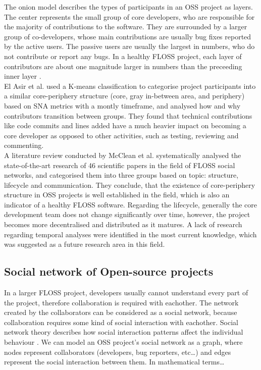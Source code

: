 The onion model describes the types of participants in an OSS project as layers. The center represents the small group of core developers, who are responsible for the majority of contributions to the software. They are surrounded by a larger group of co-developers, whose main contributions are usually bug fixes reported by the active users. The passive users are usually the largest in numbers, who do not contribute or report any bugs. In a healthy FLOSS project, each layer of contributors are about one magnitude larger in numbers than the preceeding inner layer \cite{mockusTwoCaseStudies2002}. \\

El Asir et al. \cite{elasriPeripheryCoreTemporal2017} used a K-means classification to categorise project participants into a similar core-periphery structure (core, gray in-between area, and periphery) based on SNA metrics with a montly timeframe, and analysed how and why contributors transition between groups. They found that technical contributions like code commits and lines added have a much heavier impact on becoming a core developer as opposed to other activities, such as testing, reviewing and commenting. \\

A literature review conducted by McClean et al. \cite{mccleanSocialNetworkAnalysis2021} systematically analysed the state-of-the-art research of 46 scientific papers in the field of FLOSS social networks, and categorised them into three groups based on topic: structure, lifecycle and communication. They conclude, that the existence of core-periphery structure in OSS projects is well established in the field, which is also an indicator of a healthy FLOSS software. Regarding the lifecycle, generally the core development team does not change significantly over time, however, the project becomes more decentralised and distributed as it matures. A lack of research regarding temporal analyses were identified in the most current knowledge, which was suggested as a future research area in this field. \\

\subsection{Social network of Open-source projects}
In a larger FLOSS project, developers usually cannot understand every part of the project, therefore collaboration is required with eachother. The network created by the collaborators can be considered as a social network, because collaboration requires some kind of social interaction with eachother. Social network theory describes how social interaction patterns affect the individual behaviour \cite{martinez-torresGeneticSearchPatterns2012}. We can model an OSS project's social network as a graph, where nodes represent collaborators (developers, bug reporters, etc\dots) and edges represent the social interaction between them. In mathematical terms\dots \\

